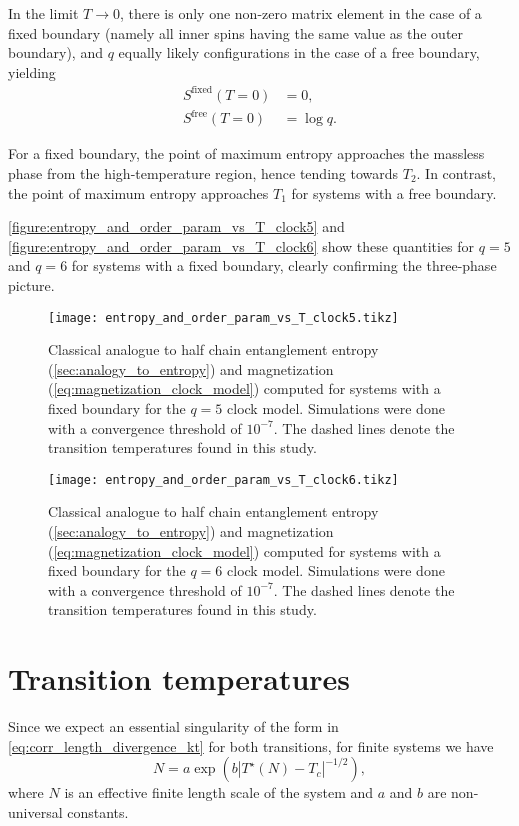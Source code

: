 In the limit $T \to 0$, there is only one non-zero matrix element in the case of a fixed boundary (namely all inner
spins having the same value as the outer boundary), and $q$ equally likely configurations in the case of a free
boundary, yielding
\begin{align*}
  S^{\text{fixed}}(T = 0) &= 0, \\
  S^{\text{free}}(T = 0)  &= \log q.
\end{align*}

For a fixed boundary, the point of maximum entropy approaches the massless phase from the high-temperature region,
hence tending towards $T_2$.
In contrast, the point of maximum entropy approaches $T_1$ for systems with a free boundary.

\autoref{figure:entropy_and_order_param_vs_T_clock5} and \autoref{figure:entropy_and_order_param_vs_T_clock6} show
these quantities for $q = 5$ and $q = 6$ for systems with a fixed boundary, clearly confirming the three-phase picture.

\begin{figure}
  \texttt{[image: entropy\_and\_order\_param\_vs\_T\_clock5.tikz]}
  \caption{Classical analogue to half chain entanglement entropy (\autoref{sec:analogy_to_entropy}) and magnetization
  (\autoref{eq:magnetization_clock_model}) computed for systems with a fixed boundary for the $q = 5$ clock model.
  Simulations were done with a convergence threshold of $10^{-7}$. The dashed lines denote the transition temperatures found in this study.}\label{figure:entropy_and_order_param_vs_T_clock5}
\end{figure}

\begin{figure}
  \texttt{[image: entropy\_and\_order\_param\_vs\_T\_clock6.tikz]}
  \caption{Classical analogue to half chain entanglement entropy (\autoref{sec:analogy_to_entropy}) and magnetization
  (\autoref{eq:magnetization_clock_model}) computed for systems with a fixed boundary for the $q = 6$ clock model.
  Simulations were done with a convergence threshold of $10^{-7}$. The dashed lines denote the transition temperatures found in this study.}\label{figure:entropy_and_order_param_vs_T_clock6}
\end{figure}

\section{Transition temperatures}

Since we expect an essential singularity of the form in \autoref{eq:corr_length_divergence_kt} for both transitions,
for finite systems we have
\begin{equation}\label{eq:kt_t_pseudocrit}
  N = a \exp \left( b |T^{\star}(N) - T_c|^{-1/2}  \right),
\end{equation}
where $N$ is an effective finite length scale of the system and $a$ and $b$ are non-universal constants.

